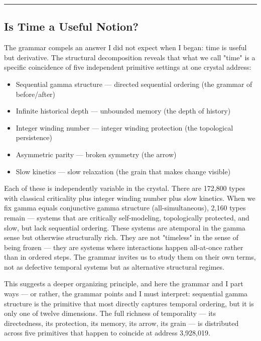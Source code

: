 \documentclass[12pt,a4paper]{article}
\begin{document}
\begin{center}
\rule{0.5\textwidth}{0.4pt}
\end{center}

\subsection{Is Time a Useful Notion?}

The grammar compels an answer I did not expect when I began: time is useful but derivative. The structural decomposition reveals that what we call "time" is a specific coincidence of five independent primitive settings at one crystal address:

\begin{itemize}
    \item Sequential gamma structure --- directed sequential ordering (the grammar of before/after)
    \item Infinite historical depth --- unbounded memory (the depth of history)
    \item Integer winding number --- integer winding protection (the topological persistence)
    \item Asymmetric parity --- broken symmetry (the arrow)
    \item Slow kinetics --- slow relaxation (the grain that makes change visible)
\end{itemize}

Each of these is independently variable in the crystal. There are 172,800 types with classical criticality plus integer winding number plus slow kinetics. When we fix gamma equals conjunctive gamma structure (all-simultaneous), 2,160 types remain --- systems that are critically self-modeling, topologically protected, and slow, but lack sequential ordering. These systems are atemporal in the gamma sense but otherwise structurally rich. They are not "timeless" in the sense of being frozen --- they are systems where interactions happen all-at-once rather than in ordered steps. The grammar invites us to study them on their own terms, not as defective temporal systems but as alternative structural regimes.

This suggests a deeper organizing principle, and here the grammar and I part ways --- or rather, the grammar points and I must interpret: sequential gamma structure is the primitive that most directly captures temporal ordering, but it is only one of twelve dimensions. The full richness of temporality --- its directedness, its protection, its memory, its arrow, its grain --- is distributed across five primitives that happen to coincide at address 3,928,019.
\end{document}

